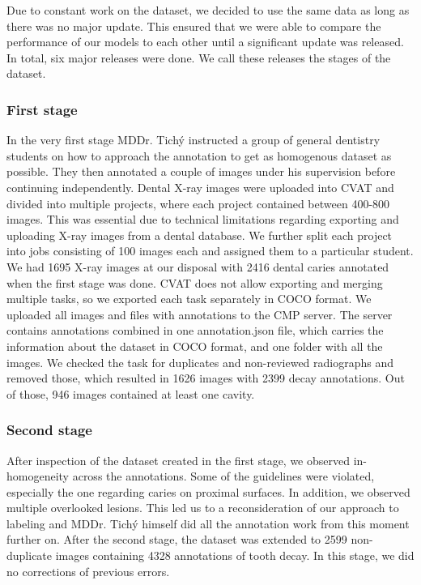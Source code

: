 Due to constant work on the dataset, we decided to use the same data as long as there was no major update. This ensured that we were able to compare the performance of our models to each other until a significant update was released. In total, six major releases were done. We call these releases the stages of the dataset.

\subsubsection{First stage}
\label{sec:dataset:first_stage}
In the very first stage MDDr. Tichý instructed a group of general dentistry students on how to approach the annotation to get as homogenous dataset as possible. They then annotated a couple of images under his supervision before continuing independently.
Dental X-ray images were uploaded into CVAT and divided into multiple projects, where each project contained between 400-800 images. This was essential due to technical limitations regarding exporting and uploading X-ray images from a dental database. We further split each project into jobs consisting of 100 images each and assigned them to a particular student. We had 1695 X-ray images at our disposal with 2416 dental caries annotated when the first stage was done.
CVAT does not allow exporting and merging multiple tasks, so we exported each task separately in COCO format. We uploaded all images and files with annotations  to the CMP server. The server contains annotations combined in one annotation.json file, which carries the information about the dataset in COCO format, and one folder with all the images. We checked the task for duplicates and non-reviewed radiographs and removed those, which resulted in 1626 images with 2399 decay annotations. Out of those, 946 images contained at least one cavity.


\subsubsection{Second stage}
\label{sec:dataset:second_stage}
After inspection of the dataset created in the first stage, we observed in-homogeneity across the annotations. Some of the guidelines were violated, especially the one regarding caries on proximal surfaces. In addition, we observed multiple overlooked lesions. This led us to a reconsideration of our approach to labeling and MDDr. Tichý himself did all the annotation work from this moment further on. After the second stage, the dataset was extended to 2599 non-duplicate images containing 4328 annotations of tooth decay. In this stage, we did no corrections of previous errors.

